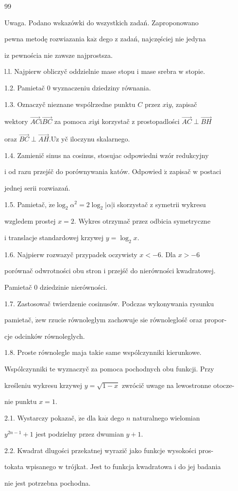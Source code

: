 \documentclass[a4paper,12pt]{article}
\begin{document}
99

Uwaga. Podano wskazówki do wszystkich zadań. Zaproponowano

pewna metodę rozwiazania $\mathrm{k}\mathrm{a}\dot{\mathrm{z}}$ dego $\mathrm{z}$ zadań, najczęściej nie jedyna

$\mathrm{i}\mathrm{z}$ pewnościa nie zawsze najprostsza.

l.l. Najpierw obliczyč oddzielnie mase stopu $\mathrm{i}$ mase srebra $\mathrm{w}$ stopie.

1.2. Pamietač $0$ wyznaczeniu dziedziny równania.

1.3. Oznaczyč nieznane wspólrzedne punktu $C$ przez $x \mathrm{i} y$, zapisač

wektory $\vec{AC}\mathrm{i}\vec{BC}$ za pomoca $x\mathrm{i}y\mathrm{i}$ korzystač $\mathrm{z}$ prostopadlości $\vec{AC}\perp\vec{BH}$

oraz $\vec{BC}\perp\vec{AH}. \mathrm{U}\dot{\mathrm{z}}$ yč iloczynu skalarnego.

1.4. Zamienič sinus na cosinus, stosujac odpowiedni wzór redukcyjny

$\mathrm{i}$ od razu przejśč do porównywania katów. Odpowied $\acute{\mathrm{z}}$ zapisač $\mathrm{w}$ postaci

jednej serii rozwiazań.

1.5. Pamietač, $\dot{\mathrm{z}}\mathrm{e} \log_{2}\alpha^{2} = 2\log_{2}|\alpha| \mathrm{i}$ skorzystač $\mathrm{z}$ symetrii wykresu

wzgledem prostej $x = 2$. Wykres otrzymač przez odbicia symetryczne

$\mathrm{i}$ translacje standardowej krzywej $y=\log_{2}x.$

1.6. Najpierw rozwazyč przypadek oczywisty $x < -6$. Dla $x > -6$

porównač odwrotności obu stron $\mathrm{i}$ przejśč do nierówności kwadratowej.

Pamietač $0$ dziedzinie nierówności.

1.7. Zastosowač twierdzenie cosinusów. Podczas wykonywania rysunku

pamietač, $\dot{\mathrm{z}}\mathrm{e}\mathrm{w}$ rzucie równoleglym zachowuje $\mathrm{s}\mathrm{i}\mathrm{e}$ równoleglośč oraz propor-

cje odcinków równoleglych.

1.8. Proste równolegle maja takie same wspólczynniki kierunkowe.

Wspólczynniki te wyznaczyč za pomoca pochodnych obu funkcji. Przy

kreśleniu wykresu krzywej $y=\sqrt{1-x}$ zwrócič uwage na lewostronne otocze-

nie punktu $x=1.$

2.1. Wystarczy pokazač, $\dot{\mathrm{z}}\mathrm{e}$ dla $\mathrm{k}\mathrm{a}\dot{\mathrm{z}}$ dego $n$ naturalnego wielomian

$y^{2n-1}+1$ jest podzielny przez dwumian $y+1.$

2.2. Kwadrat dlugości przekatnej wyrazič jako funkcje wysokości pros-

tokata wpisanego $\mathrm{w}$ trójkat. Jest to funkcja kwadratowa $\mathrm{i}$ do jej badania

nie jest potrzebna pochodna.
\end{document}
